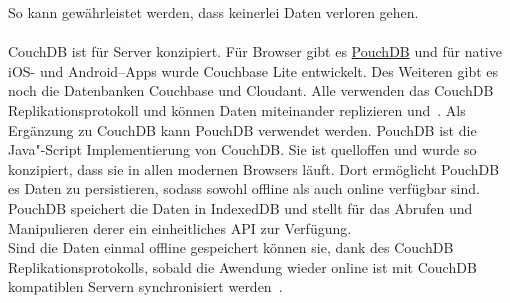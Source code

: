 So kann gewährleistet werden, dass keinerlei Daten verloren gehen.\\\\
CouchDB ist für Server konzipiert. Für Browser gibt es \hyperref[sub:pouch]{PouchDB} und für native iOS- und Android--\glspl{App} wurde Couchbase Lite entwickelt.
Des Weiteren gibt es noch die Datenbanken Couchbase und Cloudant.
Alle verwenden das CouchDB Replikationsprotokoll und können Daten miteinander replizieren und~\cite{couch}.
%
%
Als Ergänzung zu CouchDB kann PouchDB verwendet werden. PouchDB ist die Java"-Script Implementierung von CouchDB.
Sie ist quelloffen und wurde so konzipiert, dass sie in allen modernen Browsers läuft. Dort ermöglicht PouchDB es Daten zu persistieren, sodass sowohl offline als auch online verfügbar sind.
PouchDB speichert die Daten in IndexedDB und stellt für das Abrufen und Manipulieren derer ein einheitliches \gls{API} zur Verfügung.\\
Sind die Daten einmal offline gespeichert können sie, dank des CouchDB Replikationsprotokolls, sobald die Awendung wieder online ist mit CouchDB kompatiblen Servern synchronisiert werden~\cite{pouch}.